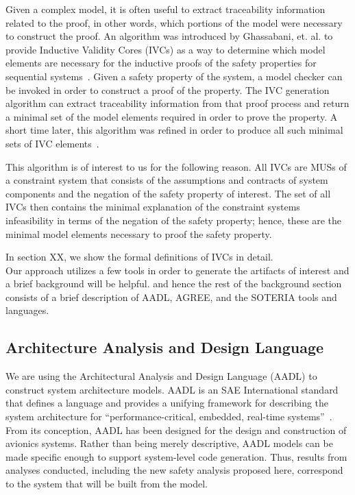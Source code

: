 Given a complex model, it is often useful to extract traceability information related to the proof, in other words, which portions of the model were necessary to construct the proof. An algorithm was introduced by Ghassabani, et. al. to provide Inductive Validity Cores (IVCs) as a way to determine which model elements are necessary for the inductive proofs of the safety properties for sequential systems~\cite{GhassabaniGW16}. Given a safety property of the system, a model checker can be invoked in order to construct a proof of the property. The IVC generation algorithm can extract traceability information from that proof process and return a minimal set of the model elements required in order to prove the property. A short time later, this algorithm was refined in order to produce all such minimal sets of IVC elements~\cite{Ghassabani2017EfficientGO}. 

This algorithm is of interest to us for the following reason. All IVCs are MUSs of a constraint system that consists of the assumptions and contracts of system components and the negation of the safety property of interest. The set of all IVCs then contains the minimal explanation of the constraint systems infeasibility in terms of the negation of the safety property; hence, these are the minimal model elements necessary to proof the safety property.

In section XX, we show the formal definitions of IVCs in detail. \\

Our approach utilizes a few tools in order to generate the artifacts of interest and a brief background will be helpful. and hence the rest of the background section consists of a brief description of AADL, AGREE, and the SOTERIA tools and languages. 

\subsection{Architecture Analysis and Design Language}
We are using the Architectural Analysis and Design Language (AADL) to construct system architecture models.  AADL is an SAE International standard that defines a language and provides a unifying framework for describing the system architecture for ``performance-critical, embedded, real-time systems''~\cite{AADL_Standard,FeilerModelBasedEngineering2012}. From its conception, AADL has been designed for the design and construction of avionics systems.  Rather than being merely descriptive, AADL models can be made specific enough to support system-level code generation.  Thus, results from analyses conducted, including the new safety analysis proposed here, correspond to the system that will be built from the model.  

